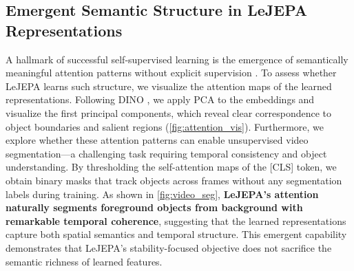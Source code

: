 \subsection{Emergent Semantic Structure in LeJEPA Representations}


A hallmark of 
successful self-supervised learning is the emergence of semantically 
meaningful attention patterns without explicit supervision 
\citep{caron2021emerging}. To assess whether LeJEPA learns such structure, 
we visualize the attention maps of the learned representations. Following 
DINO \citep{caron2021emerging}, we apply PCA to the embeddings and visualize 
the first principal components, which reveal clear correspondence to object 
boundaries and salient regions (\cref{fig:attention_vis}). Furthermore, we 
explore whether these attention patterns can enable unsupervised video 
segmentation—a challenging task requiring temporal consistency and object 
understanding. By thresholding the self-attention maps of the [CLS] token, 
we obtain binary masks that track objects across frames without any 
segmentation labels during training. As shown in \cref{fig:video_seg}, 
{\bf LeJEPA's attention naturally segments foreground objects from background 
with remarkable temporal coherence}, suggesting that the learned 
representations capture both spatial semantics and temporal structure. 
This emergent capability demonstrates that LeJEPA's stability-focused 
objective does not sacrifice the semantic richness of learned features.





